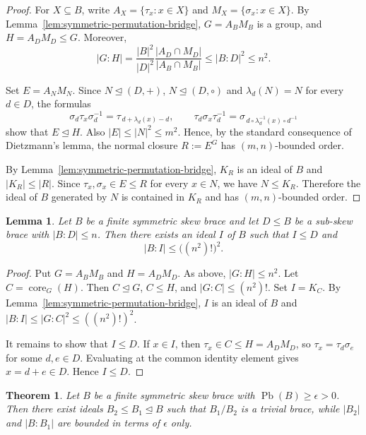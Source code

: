\documentclass[11pt, oneside]{amsart}
\numberwithin{equation}{section}
\theoremstyle{plain}
\newtheorem{lem}[equation]{Lemma}
\newtheorem{thm}[equation]{Theorem}
\theoremstyle{definition}
\newcommand{\Pb}{\operatorname{Pb} }
\begin{document}
\begin{proof}
For $X\subseteq B$, write $A_X=\{\tau_x:x\in X\}$ and $M_X=\{\sigma_x:x\in X\}$. By Lemma~\ref{lem:symmetric-permutation-bridge}, $G=A_BM_B$ is a group, and $H=A_DM_D\leqslant G$. Moreover,
$$
|G:H|=\frac{|B|^2}{|D|^2}\frac{|A_D\cap M_D|}{|A_B\cap M_B|}\leqslant |B:D|^2\leqslant n^2.
$$

Set $E=A_NM_N$. Since $N\unlhd(D,+)$, $N\unlhd(D,\circ)$ and $\lambda_d(N)=N$ for every $d\in D$, the formulas
$$
\sigma_d\tau_x\sigma_d^{-1}=\tau_{\,d+\lambda_d(x)-d},\qquad
\tau_d\sigma_x\tau_d^{-1}=\sigma_{\,d\circ\lambda_d^{-1}(x)\circ d^{-1}}
$$
show that $E\unlhd H$. Also $|E|\leqslant |N|^2\leqslant m^2$. Hence, by the standard consequence of Dietzmann's lemma, the normal closure $R:=E^G$ has $(m,n)$-bounded order.

By Lemma~\ref{lem:symmetric-permutation-bridge}, $K_R$ is an ideal of $B$ and $|K_R|\leqslant |R|$. Since $\tau_x,\sigma_x\in E\leqslant R$ for every $x\in N$, we have $N\leqslant K_R$. Therefore the ideal of $B$ generated by $N$ is contained in $K_R$ and has $(m,n)$-bounded order.
\end{proof}

\begin{lem}\label{lem:finite-index-ideal-core-symmetric}
Let $B$ be a finite symmetric skew brace and let $D\leqslant B$ be a sub-skew brace with $|B:D|\leqslant n$. Then there exists an ideal $I$ of $B$ such that $I\leqslant D$ and
$$
|B:I|\leqslant \big((n^2)!\big)^2.
$$
\end{lem}

\begin{proof}
Put $G=A_BM_B$ and $H=A_DM_D$. As above, $|G:H|\leqslant n^2$. Let $C=\operatorname{core}_G(H)$. Then $C\unlhd G$, $C\leqslant H$, and $|G:C|\leqslant (n^2)!$. Set $I=K_C$. By Lemma~\ref{lem:symmetric-permutation-bridge}, $I$ is an ideal of $B$ and $|B:I|\leqslant |G:C|^2\leqslant((n^2)!)^2$.

It remains to show that $I\leqslant D$. If $x\in I$, then $\tau_x\in C\leqslant H=A_DM_D$, so $\tau_x=\tau_d\sigma_e$ for some $d,e\in D$. Evaluating at the common identity element gives $x=d+e\in D$. Hence $I\leqslant D$.
\end{proof}

\begin{thm}\label{thm:bfc-ideals-symmetric}
Let $B$ be a finite symmetric skew brace with $\Pb(B)\geqslant\epsilon>0$. Then there exist ideals $B_2\leqslant B_1\trianglelefteq B$ such that $B_1/B_2$ is a trivial brace, while $|B_2|$ and $|B:B_1|$ are bounded in terms of $\epsilon$ only.
\end{thm}
\end{document}
